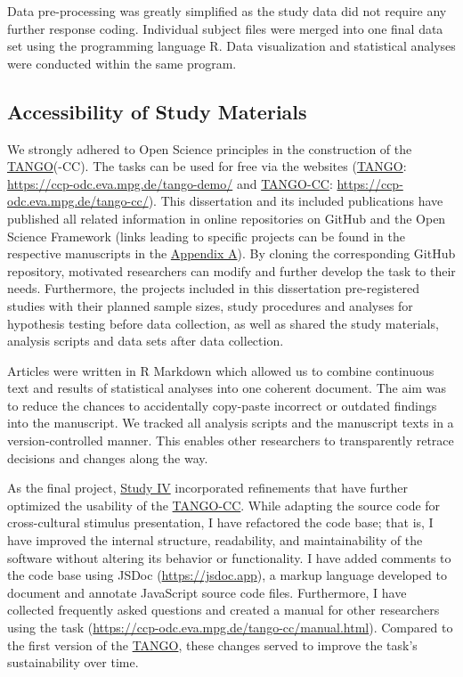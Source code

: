 \documentclass[
]{scrbook}
\begin{document}
Data pre-processing was greatly simplified as the study data did not require any further response coding. Individual subject files were merged into one final data set using the programming language R. Data visualization and statistical analyses were conducted within the same program.

\subsection{Accessibility of Study Materials}\label{approach-accessibility}

We strongly adhered to Open Science principles in the construction of the \hyperref[acronyms_TANGO]{TANGO}(-CC). The tasks can be used for free via the websites (\hyperref[acronyms_TANGO]{TANGO}: \mbox{\url{https://ccp-odc.eva.mpg.de/tango-demo/}} and \hyperref[acronyms_TANGO-CC]{TANGO-CC}: \mbox{\url{https://ccp-odc.eva.mpg.de/tango-cc/}}). This dissertation and its included publications have published all related information in online repositories on GitHub and the Open Science Framework (links leading to specific projects can be found in the respective manuscripts in the \hyperref[appendixA]{Appendix A}). By cloning the corresponding GitHub repository, motivated researchers can modify and further develop the task to their needs. Furthermore, the projects included in this dissertation pre-registered studies with their planned sample sizes, study procedures and analyses for hypothesis testing before data collection, as well as shared the study materials, analysis scripts and data sets after data collection.

Articles were written in R Markdown which allowed us to combine continuous text and results of statistical analyses into one coherent document. The aim was to reduce the chances to accidentally copy-paste incorrect or outdated findings into the manuscript. We tracked all analysis scripts and the manuscript texts in a version-controlled manner. This enables other researchers to transparently retrace decisions and changes along the way.

As the final project, \hyperref[studyIV]{Study IV} incorporated refinements that have further optimized the usability of the \hyperref[acronyms_TANGO-CC]{TANGO-CC}. While adapting the source code for cross-cultural stimulus presentation, I have refactored the code base; that is, I have improved the internal structure, readability, and maintainability of the software without altering its behavior or functionality. I have added comments to the code base using JSDoc (\mbox{\url{https://jsdoc.app}}), a markup language developed to document and annotate JavaScript source code files. Furthermore, I have collected frequently asked questions and created a manual for other researchers using the task (\mbox{\url{https://ccp-odc.eva.mpg.de/tango-cc/manual.html}}). Compared to the first version of the \hyperref[acronyms_TANGO]{TANGO}, these changes served to improve the task's sustainability over time.
\end{document}
